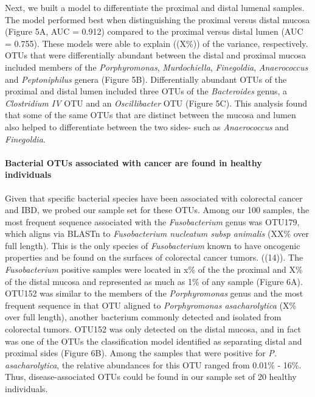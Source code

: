 \documentclass[11pt,]{article}
\let\oldparagraph\paragraph
\renewcommand{\paragraph}[1]{\oldparagraph{#1}\mbox{}}
\begin{document}
Next, we built a model to differentiate the proximal and distal lumenal
samples. The model performed best when distinguishing the proximal
versus distal mucosa (Figure 5A, AUC = 0.912) compared to the proximal
versus distal lumen (AUC = 0.755). These models were able to explain
((X\%)) of the variance, respectively. OTUs that were differentially
abundant between the distal and proximal mucosa included members of the
\emph{Porphyromonas}, \emph{Murdochiella}, \emph{Finegoldia},
\emph{Anaerococcus} and \emph{Peptoniphilus} genera (Figure 5B).
Differentially abundant OTUs of the proximal and distal lumen included
three OTUs of the \emph{Bacteroides} genus, a \emph{Clostridium IV} OTU
and an \emph{Oscillibacter} OTU (Figure 5C). This analysis found that
some of the same OTUs that are distinct between the mucosa and lumen
also helped to differentiate between the two sides- such as
\emph{Anaerococcus} and \emph{Finegoldia}.

\paragraph{Bacterial OTUs associated with cancer are found in healthy
individuals}\label{bacterial-otus-associated-with-cancer-are-found-in-healthy-individuals}

Given that specific bacterial species have been associated with
colorectal cancer and IBD, we probed our sample set for these OTUs.
Among our 100 samples, the most frequent sequence associated with the
\emph{Fusobacterium} genus was OTU179, which aligns via BLASTn to
\emph{Fusobacterium nucleatum subsp animalis} (XX\% over full length).
This is the only species of \emph{Fusobacterium} known to have oncogenic
properties and be found on the surfaces of colorectal cancer tumors.
((14)). The \emph{Fusobacterium} positive samples were located in x\% of
the the proximal and X\% of the distal mucosa and represented as much as
1\% of any sample (Figure 6A). OTU152 was similar to the members of the
\emph{Porphyromonas} genus and the most frequent sequence in that OTU
aligned to \emph{Porphyromonas asacharolytica} (X\% over full length),
another bacterium commonly detected and isolated from colorectal tumors.
OTU152 was only detected on the distal mucosa, and in fact was one of
the OTUs the classification model identified as separating distal and
proximal sides (Figure 6B). Among the samples that were positive for
\emph{P. asacharolytica}, the relative abundances for this OTU ranged
from 0.01\% - 16\%. Thus, disease-associated OTUs could be found in our
sample set of 20 healthy individuals.
\end{document}
